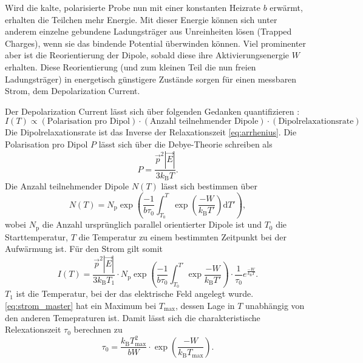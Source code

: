 Wird die kalte, polarisierte Probe nun mit einer konstanten Heizrate $b$ erwärmt, erhalten die Teilchen mehr Energie. Mit dieser Energie können sich unter anderem einzelne gebundene Ladungsträger aus Unreinheiten lösen (Trapped Charges), wenn sie
das bindende Potential überwinden können. Viel prominenter aber ist die Reorientierung der Dipole, sobald diese ihre Aktivierungsenergie $W$ erhalten. Diese Reorientierung (und zum kleinen Teil die nun freien Ladungsträger) in energetisch günstigere Zustände
sorgen für einen messbaren Strom, dem Depolarization Current.

Der Depolarization Current lässt sich über folgenden Gedanken quantifizieren \cite{fuller}:
\begin{equation*}
    I\left(T\right) \propto \left(\text{Polarisation pro Dipol}\right) \cdot \left(\text{Anzahl teilnehmender Dipole}\right) \cdot \left(\text{Dipolrelaxationsrate}\right)
\end{equation*}
Die Dipolrelaxationsrate ist das Inverse der Relaxationszeit \ref{eq:arrhenius}. Die Polarisation pro Dipol $P$ lässt sich über die Debye-Theorie schreiben als
\begin{equation}
    P = \frac{\vec{p}^2 \left\lvert \vec{E} \right\rvert}{3 k_\text{B} T}.
    \label{eq:polarisation}
\end{equation}
Die Anzahl teilnehmender Dipole $N\left(T\right)$ lässt sich bestimmen über
\begin{equation}
    N\left(T\right) = N_\text{p} \exp\left(\frac{-1}{b\tau_0} \int_{T_0}^{T} \exp\left(\frac{-W}{k_\text{B}T'}\right)\mathrm{d}T'\right),
    \label{eq:dipolanzahl}
\end{equation}
wobei $N_\text{p}$ die Anzahl ursprünglich parallel orientierter Dipole ist und $T_0$ die Starttemperatur, $T$ die Temperatur zu einem bestimmten Zeitpunkt bei der Aufwärmung ist.
Für den Strom gilt somit
\begin{equation}
    I\left(T\right) = \frac{\vec{p}^2 \left\lvert \vec{E} \right\rvert}{3 k_\text{B} T_1} \cdot N_\text{p} \exp\left(\frac{-1}{b\tau_0} \int_{T_0}^{T'} \exp{\frac{-W}{k_\text{B}T'}}\right) \cdot \frac{1}{\tau_0} e^{\frac{-W}{k_\text{B}T}}.
    \label{eq:strom_master}
\end{equation}
$T_1$ ist die Temperatur, bei der das elektrische Feld angelegt wurde.
\autoref{eq:strom_master} hat ein Maximum bei $T_\text{max}$, dessen Lage in $T$ unabhängig von den anderen Temepraturen ist.
Damit lässt sich die charakteristische Relexationszeit $\tau_0$ berechnen zu
\begin{equation}
    \tau_0 = \frac{k_\text{B}T_\text{max}^2}{bW} \cdot \exp\left(\frac{-W}{k_\text{B}T_\text{max}}\right).
    \label{eq:tau0_maximum}
\end{equation}



